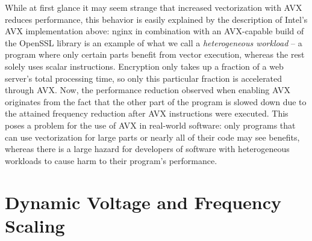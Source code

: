 While at first glance it may seem strange that increased vectorization with \gls{AVX} reduces performance, this behavior is easily explained by the description of Intel's \gls{AVX} implementation above: nginx in combination with an \gls{AVX}-capable build of the OpenSSL library is an example of what we call a \emph{heterogeneous workload} -- a program where only certain parts benefit from vector execution, whereas the rest solely uses scalar instructions. Encryption only takes up a fraction of a web server's total processing time, so only this particular fraction is accelerated through \gls{AVX}. Now, the performance reduction observed when enabling \gls{AVX} originates from the fact that the other part of the program is slowed down due to the attained frequency reduction after \gls{AVX} instructions were executed. This poses a problem for the use of \gls{AVX} in real-world software: only programs that can use vectorization for large parts or nearly all of their code may see benefits, whereas there is a large hazard for developers of software with heterogeneous workloads to cause harm to their program's performance.

\section{Dynamic Voltage and Frequency Scaling}
\label{sec:background:dvfs}

